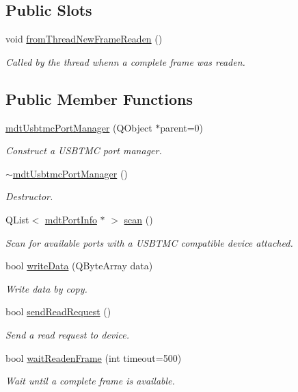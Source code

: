 \subsection*{Public Slots}
\begin{DoxyCompactItemize}
\item 
void \hyperlink{classmdt_usbtmc_port_manager_aca42b343ae1f6a324e6e45968f03bbea}{fromThreadNewFrameReaden} ()
\begin{DoxyCompactList}\small\item\em Called by the thread whenn a complete frame was readen. \end{DoxyCompactList}\end{DoxyCompactItemize}
\subsection*{Public Member Functions}
\begin{DoxyCompactItemize}
\item 
\hyperlink{classmdt_usbtmc_port_manager_a99a24e4360e70ffc63677dbe888513f7}{mdtUsbtmcPortManager} (QObject $\ast$parent=0)
\begin{DoxyCompactList}\small\item\em Construct a USBTMC port manager. \end{DoxyCompactList}\item 
\hyperlink{classmdt_usbtmc_port_manager_aad6b2eef9b5cfb5c324affb6962a463b}{$\sim$mdtUsbtmcPortManager} ()
\begin{DoxyCompactList}\small\item\em Destructor. \end{DoxyCompactList}\item 
QList$<$ \hyperlink{classmdt_port_info}{mdtPortInfo} $\ast$ $>$ \hyperlink{classmdt_usbtmc_port_manager_a992d1227810186d3c7dc166452e2e3b6}{scan} ()
\begin{DoxyCompactList}\small\item\em Scan for available ports with a USBTMC compatible device attached. \end{DoxyCompactList}\item 
bool \hyperlink{classmdt_usbtmc_port_manager_a7ff9a9ada7919af9a90286859695a29d}{writeData} (QByteArray data)
\begin{DoxyCompactList}\small\item\em Write data by copy. \end{DoxyCompactList}\item 
bool \hyperlink{classmdt_usbtmc_port_manager_a2da27dcbfc9448f1d61d93679b9a2ef3}{sendReadRequest} ()
\begin{DoxyCompactList}\small\item\em Send a read request to device. \end{DoxyCompactList}\item 
bool \hyperlink{classmdt_usbtmc_port_manager_a78ec9aec17061657f2151c677fc869eb}{waitReadenFrame} (int timeout=500)
\begin{DoxyCompactList}\small\item\em Wait until a complete frame is available. \end{DoxyCompactList}\end{DoxyCompactItemize}


